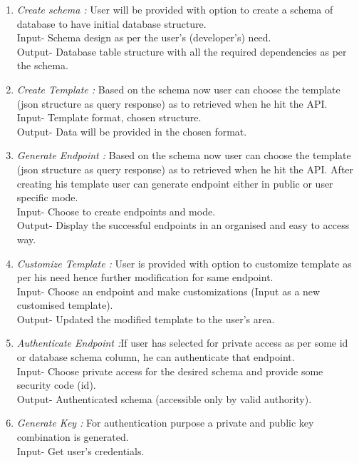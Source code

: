 \documentclass[a4paper,12pt]{report}
\begin{document}
    \begin{enumerate}
      \item {\emph {Create schema :} User will be provided with option to create a schema of database to have initial database structure. \\
      Input- Schema design as per the user’s (developer’s) need.  \\
      Output- Database table structure with all the required dependencies as per the schema.}
      \item {\emph {Create Template :} Based on the schema now user can choose the template (json structure as query response) as to retrieved when he hit the API. \\
        Input- Template format, chosen structure. \\
        Output- Data will be provided in the chosen format.
      }
      \item {\emph {Generate Endpoint :} Based on the schema now user can choose the template (json structure as query response) as to retrieved when he hit the API. After creating his template user can generate endpoint either in public or user specific mode.\\
        Input- Choose to create endpoints and mode. \\
        Output- Display the successful endpoints in an organised and easy to access way.
      }
      \item {\emph {Customize Template : } User is provided with option to customize template as per his need hence further modification for same endpoint.\\
        Input- Choose an endpoint and make customizations (Input as a new customised template).\\
        Output- Updated the modified template to the user’s area.
        }                        
      \item {\emph {Authenticate Endpoint :}If user has selected for private access as per some id or database schema column, he can authenticate that endpoint.\\
        Input- Choose private access for the desired schema and provide some security code (id).\\
        Output- Authenticated schema (accessible only by valid authority).
      }
      \item {\emph {Generate Key : }For authentication purpose a private and public key combination is generated.\\
        Input- Get user’s credentials. \\      
}
\end{enumerate}
\end{document}
